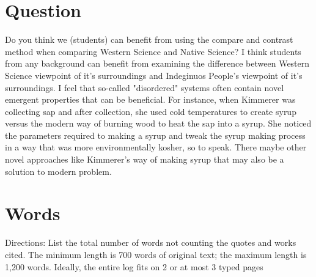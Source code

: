 \documentclass[a4paper,man,biblatex]{apa6}
\begin{document}
\section{Question}

Do you think we (students) can benefit from using the compare and contrast method when comparing Western Science and Native Science? I think students from any background can benefit from examining the difference between Western Science viewpoint of it's surroundings and Indeginuos People's viewpoint of it's surroundings. I feel that so-called "disordered" systems often contain novel emergent properties that can be beneficial. For instance, when Kimmerer was collecting sap and after collection, she used cold temperatures to create syrup versus the modern way of burning wood to heat the sap into a syrup. She noticed the parameters required to making a syrup and tweak the syrup making process in a way that was more environmentally kosher, so to speak. There maybe other novel approaches like Kimmerer's way of making syrup that may also be a solution to modern problem.  

\section{Words}

Directions: List the total number of words not counting the quotes and works cited.  The minimum length is 700 words of original text; the maximum length is 1,200 words. Ideally, the entire log fits on 2 or at most 3 typed pages

\printbibliography
\end{document}
